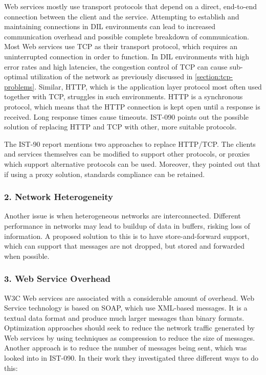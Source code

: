 Web services mostly use transport protocols that depend on a direct, end-to-end
connection between the client and the service. Attempting to establish and
maintaining connections in DIL environments can lead to increased communication
overhead and possible complete breakdown of communication. Most Web services use
TCP as their transport protocol, which requires an uninterrupted connection in
order to function. In DIL environments with high error rates and high latencies,
the congestion control of TCP can cause sub-optimal utilization of the network
as previously discussed in \cref{section:tcp-problems}. Similar, HTTP, which is
the application layer protocol most often used together with TCP, struggles in
such environments. HTTP is a synchronous protocol, which means that the HTTP
connection is kept open until a response is received. Long response times cause
timeouts. IST-090 points out the possible solution of replacing HTTP and TCP with
other, more suitable protocols.

The IST-90 report mentions two approaches to replace HTTP/TCP. The clients and
services themselves can be modified to support other protocols, or proxies
which support alternative protocols can be used\cite{ist-090}. Moreover, they
pointed out that if using a proxy solution, standards compliance can be
retained.


\subsubsection{2. Network Heterogeneity}

Another issue is when heterogeneous networks are interconnected. Different
performance in networks may lead to buildup of data in buffers, risking loss of
information. A proposed solution to this is to have store-and-forward support,
which can support that messages are not dropped, but stored and forwarded when
possible.


\subsubsection{3. Web Service Overhead}

W3C Web services are associated with a considerable amount of overhead. Web
Service technology is based on SOAP, which use XML-based messages. It is a
textual data format and produce much larger messages than binary formats.
Optimization approaches should seek to reduce the network traffic generated by
Web services by using techniques as compression to reduce the size of messages.
Another approach is to reduce the number of messages being sent, which was
looked into in IST-090\cite{ist-090}. In their work they investigated three
different ways to do this:

